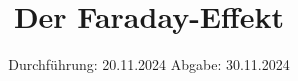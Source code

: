 

\subject{V46}
\title{Der Faraday-Effekt}
\date{%
  Durchführung: 20.11.2024
  \hspace{3em}
  Abgabe: 30.11.2024
}



\maketitle
\thispagestyle{empty}
\tableofcontents
\newpage







\printbibliography{}


